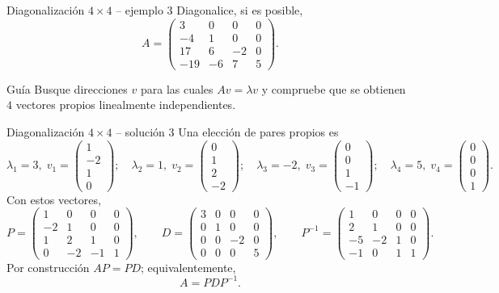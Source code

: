 \documentclass[aspectratio=169,10pt]{beamer}
\begin{document}
\begin{frame}{Diagonalización $4\times 4$ -- ejemplo 3}
\small
Diagonalice, si es posible,
\[
A=\begin{pmatrix}3 & 0 & 0 & 0\\-4 & 1 & 0 & 0\\17 & 6 & -2 & 0\\-19 & -6 & 7 & 5\end{pmatrix}.
\]
\begin{block}{Guía}
Busque direcciones $v$ para las cuales $Av=\lambda v$ y compruebe que se obtienen $4$ vectores propios linealmente independientes.
\end{block}
\end{frame}
\begin{frame}{Diagonalización $4\times 4$ -- solución 3}
\scriptsize
Una elección de pares propios es
\[
\lambda_1=3,\;v_1=\begin{pmatrix}1\\-2\\1\\0\end{pmatrix};\quad \lambda_2=1,\;v_2=\begin{pmatrix}0\\1\\2\\-2\end{pmatrix};\quad \lambda_3=-2,\;v_3=\begin{pmatrix}0\\0\\1\\-1\end{pmatrix};\quad \lambda_4=5,\;v_4=\begin{pmatrix}0\\0\\0\\1\end{pmatrix}.
\]
Con estos vectores,
\[
P=\begin{pmatrix}1 & 0 & 0 & 0\\-2 & 1 & 0 & 0\\1 & 2 & 1 & 0\\0 & -2 & -1 & 1\end{pmatrix},\qquad D=\begin{pmatrix}3 & 0 & 0 & 0\\0 & 1 & 0 & 0\\0 & 0 & -2 & 0\\0 & 0 & 0 & 5\end{pmatrix},\qquad P^{-1}=\begin{pmatrix}1 & 0 & 0 & 0\\2 & 1 & 0 & 0\\-5 & -2 & 1 & 0\\-1 & 0 & 1 & 1\end{pmatrix}.
\]
Por construcción $AP=PD$; equivalentemente,
\[
\boxed{A=PDP^{-1}}.
\]
\end{frame}
\end{document}
